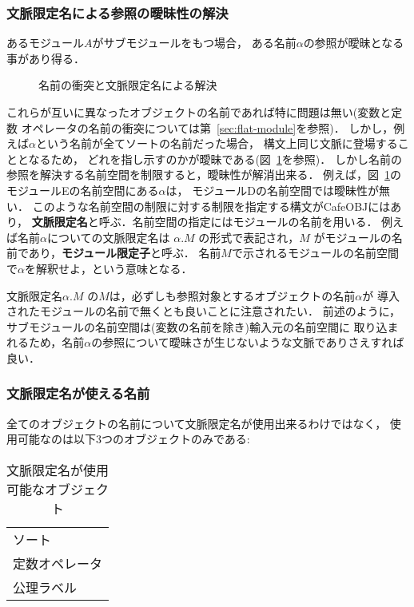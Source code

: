 \documentclass[a4paper,oneside,10pt]{memoir}
\newenvironment{vvtm}%
{\parskip=0pt\lineskip=0pt\begin{center}\begin{minipage}{0.8\textwidth}\begin{snugshade}}%
  {\end{snugshade}\end{minipage}\end{center}}
\begin{document}
\subsubsection{文脈限定名による参照の曖昧性の解決}
\label{sec:qualified-name}
あるモジュール$A$がサブモジュールをもつ場合，
ある名前$\alpha$の参照が曖昧となる事があり得る．
\begin{figure}
\begin{center}

\end{center}
\caption{名前の衝突と文脈限定名による解決}
\label{fig:disunbig}
\end{figure}
これらが互いに異なったオブジェクトの名前であれば特に問題は無い(変数と定数%
オペレータの名前の衝突については第~\ref{sec:flat-module}を参照)．
しかし，例えば$\alpha$という名前が全てソートの名前だった場合，
構文上同じ文脈に登場することとなるため，%
どれを指し示すのかが曖昧である(図~\ref{fig:disunbig}を参照)．
しかし名前の参照を解決する名前空間を制限すると，曖昧性が解消出来る．
例えば，図~\ref{fig:disunbig}のモジュールEの名前空間にある$\alpha$は，
モジュールDの名前空間では曖昧性が無い．
このような名前空間の制限に対する制限を指定する構文がCafeOBJにはあり，%
\textbf{文脈限定名}と呼ぶ．名前空間の指定にはモジュールの名前を用いる．
例えば名前$\alpha$についての文脈限定名は $\alpha.M$ の形式で表記され，$M$%
がモジュールの名前であり，\textbf{モジュール限定子}と呼ぶ．
名前$M$で示されるモジュールの名前空間で$\alpha$を解釈せよ，という意味となる．

文脈限定名$\alpha.M$ の$M$は，必ずしも参照対象とするオブジェクトの名前$\alpha$が%
導入されたモジュールの名前で無くとも良いことに注意されたい．
前述のように，サブモジュールの名前空間は(変数の名前を除き)輸入元の名前空間に
取り込まれるため，名前$\alpha$の参照について曖昧さが生じないような文脈でありさえすれば良い．

\subsubsection{文脈限定名が使える名前}
\label{sec:available-qualified-name}

全てのオブジェクトの名前について文脈限定名が使用出来るわけではなく，
使用可能なのは以下3つのオブジェクトのみである:
\begin{table}[htb]
\begin{vvtm}
\begin{center}
\begin{tabular}{l}
ソート \\
定数オペレータ \\
公理ラベル \\
\end{tabular}
\end{center}
\end{vvtm}
\caption{文脈限定名が使用可能なオブジェクト}
\label{tbl:qulifiable-names}
\end{table}
\end{document}
